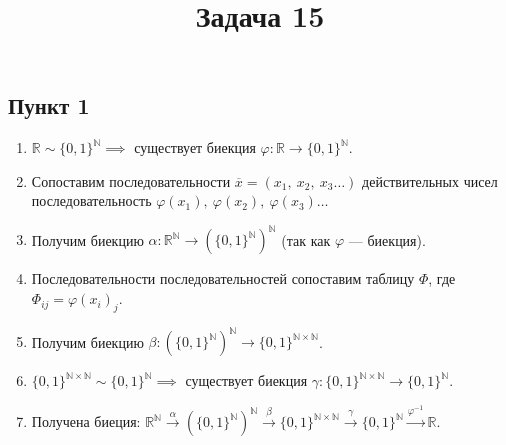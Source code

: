 \documentclass{article}
\title{Задача 15}
\date{}
\author{}
\begin{document}
\maketitle
\noindent{}
\subsection*{Пункт 1}
\begin{enumerate}
    \item \(\mathbb{R} \sim \{0, 1\}^{\mathbb{N}} \implies\) существует биекция \(\varphi: \mathbb{R} \to  \{0, 1\}^{\mathbb{N}}\).
    \item Сопоставим последовательности \(\overline{x} = (x_1,\ x_2,\ x_3 \dots)\) действительных чисел последовательность \(\varphi(x_1),\ \varphi(x_2),\ \varphi(x_3) \dots\) 
    \item Получим биекцию \(\alpha: \mathbb{R}^{\mathbb{N}} \to (\{0, 1\}^{\mathbb{N}})^{\mathbb{N}}\) (так как \(\varphi\) --- биекция).
    \item Последовательности последовательностей сопоставим таблицу \(\Phi\), где \(\Phi_{ij} = \varphi(x_i)_j\).
    \item Получим биекцию \(\beta: (\{0, 1\}^\mathbb{N})^{\mathbb{N}} \to \{0, 1\}^{\mathbb{N} \times \mathbb{N}}\).
    \item \(\{0, 1\}^{\mathbb{N} \times \mathbb{N}} \sim \{0, 1\}^{\mathbb{N}} \implies \) существует биекция \(\gamma: \{0, 1\}^{\mathbb{N} \times \mathbb{N}} \to \{0, 1\}^{\mathbb{N}}\).
    \item Получена биеция: \(\displaystyle \mathbb{R}^\mathbb{N} \overset{\alpha}{\to} (\{0, 1\}^\mathbb{N})^{\mathbb{N}} \overset{\beta}{\to } \{0, 1\}^{\mathbb{N} \times \mathbb{N}} \overset{\gamma}{\to } \{0, 1\}^{\mathbb{N}} \overset{\varphi^{-1}}{\to} \mathbb{R}\). 
\end{enumerate}
\end{document}
